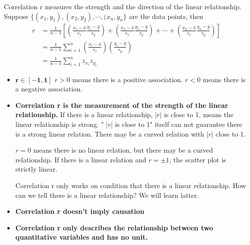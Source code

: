 \documentclass[a4paper, 12pt,twoside]{book}
\begin{document}
\begin{itemize}
\begin{itemize}
 Correlation r measures the strength and the direction of the linear relationship. Suppose $\{(x_1, y_1), (x_2, y_2), \cdots, (x_n, y_n\}$ are the data points, then
 \begin{equation*}
 \begin{split}
 r&=\frac{1}{n-1}[(\frac{x_1-\bar{x}}{s_x}\frac{y_1-\bar{y}}{s_y}) + (\frac{x_2-\bar{x}}{s_x}\frac{y_2-\bar{y}}{s_y})+\cdots + (\frac{x_n-\bar{x}}{s_x}\frac{y_n-\bar{y}}{s_y})]\\
 &= \frac{1}{n-1}\sum_{i=1}^n(\frac{x_i-\bar{x}}{s_x})(\frac{y_i-\bar{y}}{s_y})\\
 &= \frac{1}{n-1}\sum_{i=1}^n z_{x_i}z_{y_i}
 \end{split} 
 \end{equation*}
 \vspace{0.6cm}
 
 \begin{itemize}
  \item $\mathbf{r\in [-1, 1]}$
  \vspace{0.6cm}
  $r>0$ means there is a positive association. $r<0$ means there is a negative association.
  \vspace{0.6cm}
  
  \item \textbf{Correlation r is the measurement of the strength of the linear relationship.}
  \vspace{0.6cm}
  If there is a linear relationship, $|r|$ is close to 1, means the linear relationship is strong. " $|r|$ is close to 1" itself can not guarantee there is a strong linear relation. There may be a curved relation with $|r|$ close to 1.
  \vspace{0.6cm}
  
  $r = 0$ means there is no linear relation, but there may be a curved relationship. If there is a linear relation and $r = \pm 1$, the scatter plot is strictly linear.
  \vspace{0.6cm}
  
  Correlation r only works on condition that there is a linear relationship. How can we tell there is a linear relationship? We will learn latter.
   \vspace{0.6cm}
   
 \item \textbf{Correlation r doesn't imply causation}
 \vspace{0.6cm}
 
 \item \textbf{Correlation r only describes the relationship between two quantitative variables and has no unit.}   
 \end{itemize} 
\end{itemize}
\vspace{0.6cm}


\end{itemize}
\end{document}
